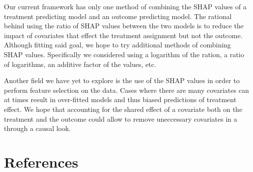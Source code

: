 \documentclass{article}
\begin{document}
Our current framework has only one method of combining the SHAP values of a treatment predicting model and an outcome predicting model. The rational behind using the ratio of SHAP values between the two models is to reduce the impact of covariates that effect the treatment assignment but not the outcome. Although fitting said goal, we hope to try additional methods of combining SHAP values. Specifically we considered using a logarithm of the ration, a ratio of logarithms, an additive factor of the values, etc. 

Another field we have yet to explore is the use of the SHAP values in order to perform feature selection on the data. Cases where there are many covariates can at times result in over-fitted models and thus biased predictions of treatment effect. We hope that accounting for the shared effect of a covariate both on the treatment and the outcome could allow to remove uneccessary covariates in a through a causal look. 

\section{References}



\end{document}
